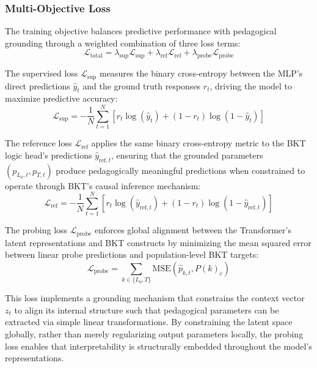 \documentclass[applsci,article,submit,moreauthors,pdftex]{Definitions/mdpi}
\begin{document}
\subsubsection{Multi-Objective Loss} \label{sec_loss}

The training objective balances predictive performance with pedagogical grounding through a weighted combination of three loss terms:
\begin{equation} \label{eq:total_loss}
    \mathcal{L}_{\text{total}} = \lambda_{\text{sup}} \mathcal{L}_{\text{sup}} + \lambda_{\text{ref}} \mathcal{L}_{\text{ref}} + \lambda_{\text{probe}} \mathcal{L}_{\text{probe}}
\end{equation}

The supervised loss $\mathcal{L}_{\text{sup}}$ measures the binary cross-entropy between the MLP's direct predictions $\hat{y}_t$ and the ground truth responses $r_t$, driving the model to maximize predictive accuracy:
\begin{equation}
    \mathcal{L}_{\text{sup}} = -\frac{1}{N} \sum_{t=1}^N \left[ r_t \log(\hat{y}_t) + (1-r_t) \log(1-\hat{y}_t) \right]
\end{equation}

The reference loss $\mathcal{L}_{\text{ref}}$ applies the same binary cross-entropy metric to the BKT logic head's predictions $\hat{y}_{\text{ref},t}$, ensuring that the grounded parameters $(p_{L_0,t}, p_{T,t})$ produce pedagogically meaningful predictions when constrained to operate through BKT's causal inference mechanism:
\begin{equation}
    \mathcal{L}_{\text{ref}} = -\frac{1}{N} \sum_{t=1}^N \left[ r_t \log(\hat{y}_{\text{ref},t}) + (1-r_t) \log(1-\hat{y}_{\text{ref},t}) \right]
\end{equation}

The probing loss $\mathcal{L}_{\text{probe}}$ enforces global alignment between the Transformer's latent representations and BKT constructs by minimizing the mean squared error between linear probe predictions and population-level BKT targets:
\begin{equation}
    \mathcal{L}_{\text{probe}} = \sum_{k \in \{L_0, T\}} \text{MSE}\left( \hat{p}_{k,t}, P(k)_c \right)
\end{equation}

This loss implements a grounding mechanism that constrains the context vector $z_t$ to align its internal structure such that pedagogical parameters can be extracted via simple linear transformations. By constraining the latent space globally, rather than merely regularizing output parameters locally, the probing loss enables that interpretability is structurally embedded throughout the model's representations.
\end{document}
